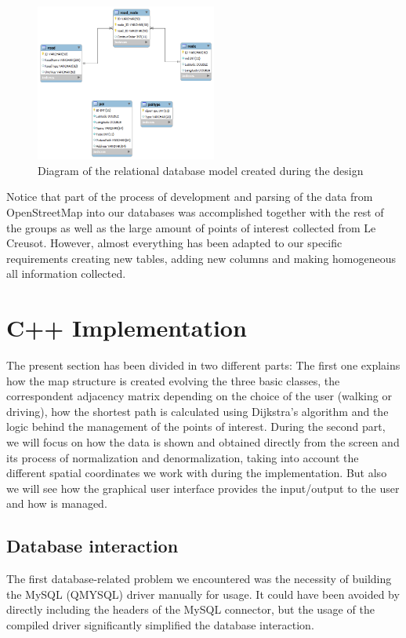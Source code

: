 \documentclass{article}
\begin{document}
\begin{figure}[h]
\centering
\includegraphics[width=0.53\textwidth]{big_schneider.png}
\caption{Diagram of the relational database model created during the design}
\label{fig:RelDBdiagram}
\end{figure}

Notice that part of the process of development and parsing of the data from OpenStreetMap into our databases was accomplished together with the rest of the groups as well as the large amount of points of interest collected from Le Creusot. However, almost everything has been adapted to our specific requirements creating new tables, adding new columns and making homogeneous all information collected. 

\clearpage
\section{C++ Implementation}
The present section has been divided in two different parts: The first one explains how the map structure is created evolving the three basic classes, the correspondent adjacency matrix depending on the choice of the user (walking or driving), how the shortest path is calculated using Dijkstra's algorithm and the logic behind the management of the points of interest. During the second part, we will focus on how the data is shown and obtained directly from the screen and its process of normalization and denormalization, taking into account the different spatial coordinates we work with during the implementation. But also we will see how the graphical user interface provides the input/output to the user and how is managed.

\subsection{Database interaction}

The first database-related problem we encountered was the necessity of building the MySQL (QMYSQL) driver manually for usage. It could have been avoided by directly including the headers of the MySQL connector, but the usage of the compiled driver significantly simplified the database interaction.
\end{document}
